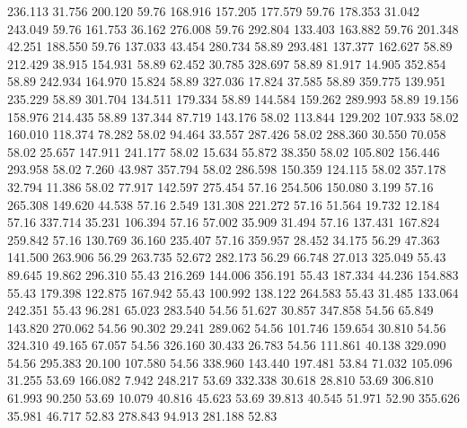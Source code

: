  236.113   31.756  200.120        59.76
 168.916  157.205  177.579        59.76
 178.353   31.042  243.049        59.76
 161.753   36.162  276.008        59.76
 292.804  133.403  163.882        59.76
 201.348   42.251  188.550        59.76
 137.033   43.454  280.734        58.89
 293.481  137.377  162.627        58.89
 212.429   38.915  154.931        58.89
  62.452   30.785  328.697        58.89
  81.917   14.905  352.854        58.89
 242.934  164.970   15.824        58.89
 327.036   17.824   37.585        58.89
 359.775  139.951  235.229        58.89
 301.704  134.511  179.334        58.89
 144.584  159.262  289.993        58.89
  19.156  158.976  214.435        58.89
 137.344   87.719  143.176        58.02
 113.844  129.202  107.933        58.02
 160.010  118.374   78.282        58.02
  94.464   33.557  287.426        58.02
 288.360   30.550   70.058        58.02
  25.657  147.911  241.177        58.02
  15.634   55.872   38.350        58.02
 105.802  156.446  293.958        58.02
   7.260   43.987  357.794        58.02
 286.598  150.359  124.115        58.02
 357.178   32.794   11.386        58.02
  77.917  142.597  275.454        57.16
 254.506  150.080    3.199        57.16
 265.308  149.620   44.538        57.16
   2.549  131.308  221.272        57.16
  51.564   19.732   12.184        57.16
 337.714   35.231  106.394        57.16
  57.002   35.909   31.494        57.16
 137.431  167.824  259.842        57.16
 130.769   36.160  235.407        57.16
 359.957   28.452   34.175        56.29
  47.363  141.500  263.906        56.29
 263.735   52.672  282.173        56.29
  66.748   27.013  325.049        55.43
  89.645   19.862  296.310        55.43
 216.269  144.006  356.191        55.43
 187.334   44.236  154.883        55.43
 179.398  122.875  167.942        55.43
 100.992  138.122  264.583        55.43
  31.485  133.064  242.351        55.43
  96.281   65.023  283.540        54.56
  51.627   30.857  347.858        54.56
  65.849  143.820  270.062        54.56
  90.302   29.241  289.062        54.56
 101.746  159.654   30.810        54.56
 324.310   49.165   67.057        54.56
 326.160   30.433   26.783        54.56
 111.861   40.138  329.090        54.56
 295.383   20.100  107.580        54.56
 338.960  143.440  197.481        53.84
  71.032  105.096   31.255        53.69
 166.082    7.942  248.217        53.69
 332.338   30.618   28.810        53.69
 306.810   61.993   90.250        53.69
  10.079   40.816   45.623        53.69
  39.813   40.545   51.971        52.90
 355.626   35.981   46.717        52.83
 278.843   94.913  281.188        52.83

